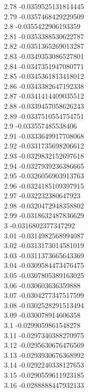 {2.78	-0.0359525131814445\\
2.79	-0.0357468429229509\\
2.8	-0.0355422906193359\\
2.81	-0.0353388530622787\\
2.82	-0.0351365269013287\\
2.83	-0.0349353086527801\\
2.84	-0.0347351947080771\\
2.85	-0.0345361813418012\\
2.86	-0.0343382647192338\\
2.87	-0.0341414409035512\\
2.88	-0.0339457058626243\\
2.89	-0.0337510554754751\\
2.9	-0.033557485538406\\
2.91	-0.0333649917708068\\
2.92	-0.0331735698206612\\
2.93	-0.0329832152697618\\
2.94	-0.0327939236386665\\
2.95	-0.0326056903913763\\
2.96	-0.0324185109397915\\
2.97	-0.032232380647923\\
2.98	-0.0320472948358802\\
2.99	-0.0318632487836629\\
3	-0.0316802377347292\\
3.01	-0.0314982568994087\\
3.02	-0.0313173014581019\\
3.03	-0.0311373665643369\\
3.04	-0.0309584473476475\\
3.05	-0.0307805389163025\\
3.06	-0.030603636359888\\
3.07	-0.0304277347517599\\
3.08	-0.0302528291513494\\
3.09	-0.030078914606358\\
3.1	-0.0299059861548278\\
3.11	-0.0297340388270975\\
3.12	-0.0295630676476569\\
3.13	-0.0293930676368992\\
3.14	-0.0292240338127653\\
3.15	-0.0290559611923185\\
3.16	-0.0288888447932133\\
}
